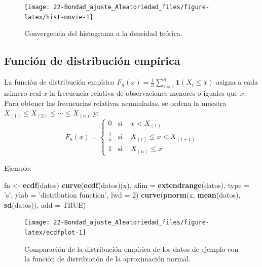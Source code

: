 \documentclass[
]{book}
\newenvironment{Shaded}{\begin{snugshade}}{\end{snugshade}}
\newcommand{\DataTypeTok}[1]{\textcolor[rgb]{0.13,0.29,0.53}{#1}}
\newcommand{\DecValTok}[1]{\textcolor[rgb]{0.00,0.00,0.81}{#1}}
\newcommand{\KeywordTok}[1]{\textcolor[rgb]{0.13,0.29,0.53}{\textbf{#1}}}
\newcommand{\NormalTok}[1]{#1}
\newcommand{\OtherTok}[1]{\textcolor[rgb]{0.56,0.35,0.01}{#1}}
\newcommand{\StringTok}[1]{\textcolor[rgb]{0.31,0.60,0.02}{#1}}
\theoremstyle{break}
\theoremstyle{definition}
\theoremstyle{definition}
\theoremstyle{definition}
\theoremstyle{remark}
\begin{document}
\begin{figure}[!htb]

{\centering \texttt{[image: 22-Bondad\_ajuste\_Aleatoriedad\_files/figure-latex/hist-movie-1]} 

}

\caption{Convergencia del histograma a la densidad teórica.}\label{fig:hist-movie}
\end{figure}

\hypertarget{empdistr}{%
\subsection{Función de distribución empírica}\label{empdistr}}

La función de distribución empírica \(F_n\left( x \right)=\frac{1}{n}\sum_{i=1}^{n}\mathbf{1}\left( X_i\leq x\right)\) asigna a cada número real \(x\) la frecuencia relativa de observaciones menores o iguales que \(x\).
Para obtener las frecuencias relativas acumuladas, se ordena la muestra \(X_{(1)}\leq X_{(2)}\leq \cdots \leq X_{(n)}\) y:
\[F_n(x)=\left \{
\begin{array}{cll}
0 & \text{si } &x<X_{\left(  1\right)  }\\
\tfrac{i}n & \text{si } & X_{\left(  i\right)  }\leq x<X_{\left(  i+1\right)  }\\
1 & \text{si } & X_{\left(  n\right)  }\leq x
\end{array}
\right.\]

Ejemplo:

\begin{Shaded}
\begin{Highlighting}[]
\NormalTok{fn <-}\StringTok{ }\KeywordTok{ecdf}\NormalTok{(datos)}
\KeywordTok{curve}\NormalTok{(}\KeywordTok{ecdf}\NormalTok{(datos)(x), }\DataTypeTok{xlim =} \KeywordTok{extendrange}\NormalTok{(datos), }\DataTypeTok{type =} \StringTok{'s'}\NormalTok{, }
      \DataTypeTok{ylab =} \StringTok{'distribution function'}\NormalTok{, }\DataTypeTok{lwd =} \DecValTok{2}\NormalTok{)}
\KeywordTok{curve}\NormalTok{(}\KeywordTok{pnorm}\NormalTok{(x, }\KeywordTok{mean}\NormalTok{(datos), }\KeywordTok{sd}\NormalTok{(datos)), }\DataTypeTok{add =} \OtherTok{TRUE}\NormalTok{)}
\end{Highlighting}
\end{Shaded}

\begin{figure}[!htb]

{\centering \texttt{[image: 22-Bondad\_ajuste\_Aleatoriedad\_files/figure-latex/ecdfplot-1]} 

}

\caption{Comparación de la distribución empírica de los datos de ejemplo con la función de distribución de la aproximación normal.}\label{fig:ecdfplot}
\end{figure}
\end{document}
